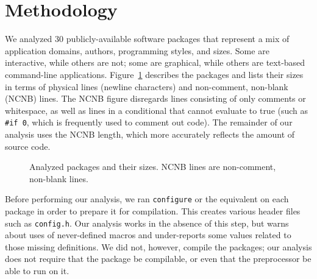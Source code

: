 \documentclass[10pt]{article}
\def\numpackages{30}
\newcommand{\file}[1]{\texttt{#1}}
\newcommand{\captionsmall}[1]{\caption[]{\small #1}}
\begin{document}
%
%
%






\section{Methodology}
\label{sec:methodology}

We analyzed {\numpackages} publicly-available software packages that
represent a mix of application domains, authors, programming styles, and
sizes.  Some are interactive, while others are not; some are graphical,
while others are text-based command-line applications.
Figure~\ref{fig:packages} describes the packages and lists their sizes in
terms of physical lines (newline characters) and non-comment, non-blank
(NCNB) lines.  The NCNB figure disregards lines consisting of only comments
or whitespace, as well as lines in a conditional that cannot evaluate to
true (such as {\tt \#if 0}, which is frequently used to comment out code).
The remainder of our analysis uses the NCNB length, which more accurately
reflects the amount of source code.

\begin{figure}
\centering
{%
  \small
  \setlength{\tabcolsep}{.25em}
  
}
\captionsmall{Analyzed packages and their sizes.  NCNB lines are non-comment,
  non-blank lines.}
\label{fig:packages}
\end{figure}

Before performing our analysis, we ran {\tt configure} or the equivalent on
each package in order to prepare it for compilation.  This creates various
header files such as \file{config.h}.  Our analysis works in the
absence of this step, but warns about uses of never-defined macros and
under-reports some values related to those missing definitions.  We did
not, however, compile the packages; our analysis does not require that the
package be compilable, or even that the preprocessor be able to run on it.
\end{document}
